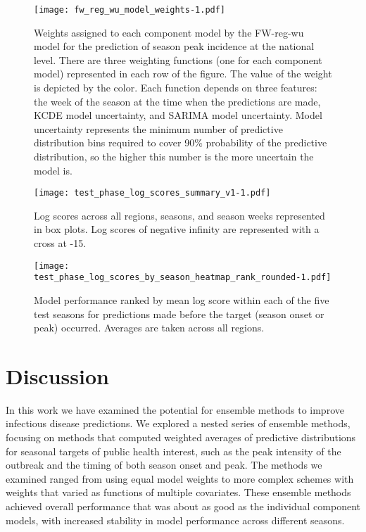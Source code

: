 \documentclass[10pt,letterpaper]{article}
\begin{document}
\begin{figure}[htbp]
\centering
\texttt{[image: fw\_reg\_wu\_model\_weights-1.pdf]}
\caption{\label{fig:FWregwuModelWeights}Weights assigned to each
component model by the FW-reg-wu model for the prediction of season peak
incidence at the national level. There are three weighting functions
(one for each component model) represented in each row of the figure.
The value of the weight is depicted by the color. Each function depends
on three features: the week of the season at the time when the
predictions are made, KCDE model uncertainty, and SARIMA model
uncertainty. Model uncertainty represents the minimum number of
predictive distribution bins required to cover 90\% probability of the
predictive distribution, so the higher this number is the more uncertain
the model is.}
\end{figure}

\begin{figure}[htbp]
\centering
\texttt{[image: test\_phase\_log\_scores\_summary\_v1-1.pdf]}
\caption{\label{fig:test_phase_log_score_boxplot}Log scores across all
regions, seasons, and season weeks represented in box plots. Log scores
of negative infinity are represented with a cross at -15.}
\end{figure}

\begin{figure}[htbp]
\centering
\texttt{[image: test\_phase\_log\_scores\_by\_season\_heatmap\_rank\_rounded-1.pdf]}
\caption{\label{fig:test_phase_log_scores_heatmap}Model performance
ranked by mean log score within each of the five test seasons for
predictions made before the target (season onset or peak) occurred.
Averages are taken across all regions.}
\end{figure}

\section{Discussion}\label{discussion}

In this work we have examined the potential for ensemble methods to
improve infectious disease predictions. We explored a nested series of
ensemble methods, focusing on methods that computed weighted averages of
predictive distributions for seasonal targets of public health interest,
such as the peak intensity of the outbreak and the timing of both season
onset and peak. The methods we examined ranged from using equal model
weights to more complex schemes with weights that varied as functions of
multiple covariates. These ensemble methods achieved overall performance
that was about as good as the individual component models, with
increased stability in model performance across different seasons.
\end{document}
